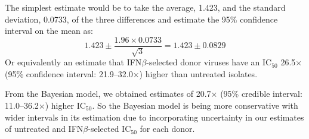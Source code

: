 \documentclass[12pt]{article}
\newcommand{\ifnb}{IFN${\beta}$}
\newcommand{\icFifty}{IC$_{50}$}
\begin{document}
The simplest estimate would be to take the average, 1.423,
and the standard deviation, 0.0733,
of the three differences and estimate the 95\% confidence interval on the mean as: 
\[1.423\pm \frac{1.96\times 0.0733}{\sqrt{3}}=1.423 \pm 0.0829\]
Or equivalently an estimate that \ifnb-selected donor viruses have an \icFifty{} 26.5$\times$ (95\% confidence interval: 21.9--32.0$\times$) higher than untreated isolates.

From the Bayesian model, we obtained estimates of 20.7$\times$ (95\% credible interval: 11.0--36.2$\times$) higher \icFifty{}.
So the Bayesian model is being more conservative with wider intervals in its estimation due to incorporating uncertainty in our estimates of untreated and \ifnb-selected \icFifty{} for each donor.
\end{document}
